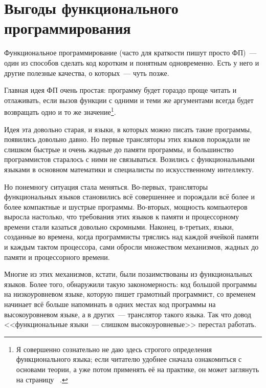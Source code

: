 \documentclass[
  paper=a4,
  fontsize=14pt,
  openany,
  appendixprefix=true
]{scrbook}
\begin{document}
\section{Выгоды функционального программирования}
\label{benefits}

Функциональное программирование (часто для краткости пишут просто ФП)~--- один из способов сделать код коротким и понятным одновременно. Есть у него и другие полезные качества, о которых~--- чуть позже.

Главная идея ФП очень простая: программу будет гораздо проще читать и отлаживать, если вызов функции с одними и теми же аргументами всегда будет возвращать одно и то же значение\footnote{Я совершенно сознательно не даю здесь строгого определения функционального языка; если читателю удобнее сначала ознакомиться с основами теории, а уже потом применять её на практике, он может заглянуть на страницу ~\pageref{definition}.}.

Идея эта довольно старая, и языки, в которых можно писать такие программы, появились довольно давно. Но первые трансляторы этих языков порождали не слишком быстрые и очень жадные до памяти программы, и большинство программистов старалось с ними не связываться. Возились с функциональными языками в основном математики и специалисты по искусственному интеллекту.

Но понемногу ситуация стала меняться. Во-первых, трансляторы функциональных языков становились всё совершеннее и порождали всё более и более компактные и шустрые программы. Во-вторых, мощность компьютеров выросла настолько, что требования этих языков к памяти и процессорному времени стали казаться довольно скромными. Наконец, в-третьих, языки, созданные во времена, когда программисты тряслись над каждой ячейкой памяти и каждым тактом процессора, сами обросли множеством механизмов, жадных до памяти и процессорного времени.

Многие из этих механизмов, кстати, были позаимствованы из функциональных языков. Более того, обнаружили такую закономерность: код большой программы на низкоуровневом языке, которую пишет грамотный программист, со временем начинает всё больше напоминать в одних местах код программы на высокоуровневом языке, а в других~--- транслятор такого языка. Так что довод <<функциональные языки~--- слишком высокоуровневые>> перестал работать.

\end{document}
